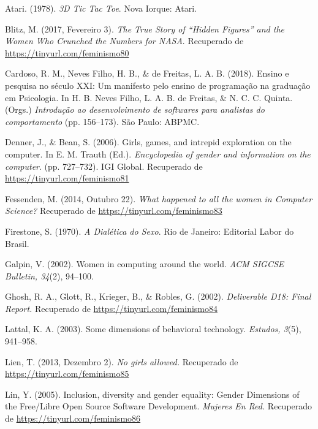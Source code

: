 \hangindent=25pt
\noindent Atari. (1978). \textit{3D Tic Tac Toe}. Nova Iorque: Atari.

\hangindent=25pt
\noindent Blitz, M. (2017, Fevereiro 3). \textit{The True Story of “Hidden Figures” and the Women Who Crunched the Numbers for NASA}. Recuperado de \url{https://tinyurl.com/feminismo80}

\hangindent=25pt
\noindent Cardoso, R. M., Neves Filho, H. B., \& de Freitas, L. A. B. (2018). Ensino e pesquisa no século XXI: Um manifesto pelo ensino de programação na graduação em Psicologia. In H. B. Neves Filho, L. A. B. de Freitas, \& N. C. C. Quinta. (Orgs.) \textit{Introdução ao desenvolvimento de softwares para analistas do comportamento} (pp. 156–173). São Paulo: ABPMC.

\hangindent=25pt
\noindent Denner, J., \& Bean, S. (2006). Girls, games, and intrepid exploration on the computer. In E. M. Trauth (Ed.). \textit{Encyclopedia of gender and information on the computer}. (pp. 727–732). IGI Global. Recuperado de \url{https://tinyurl.com/feminismo81}

\hangindent=25pt
\noindent Fessenden, M. (2014, Outubro 22). \textit{What happened to all the women in Computer Science?} Recuperado de \url{https://tinyurl.com/feminismo83}

\hangindent=25pt
\noindent Firestone, S. (1970). \textit{A Dialética do Sexo}. Rio de Janeiro: Editorial Labor do Brasil.

\hangindent=25pt
\noindent Galpin, V. (2002). Women in computing around the world. \textit{ACM SIGCSE Bulletin, 34}(2), 94–100.

\hangindent=25pt
\noindent Ghosh, R. A., Glott, R., Krieger, B., \& Robles, G. (2002). \textit{Deliverable D18: Final Report.} Recuperado de \url{https://tinyurl.com/feminismo84}

\hangindent=25pt
\noindent Lattal, K. A. (2003). Some dimensions of behavioral technology. \textit{Estudos, 3}(5), 941–958.

\hangindent=25pt
\noindent Lien, T. (2013, Dezembro 2). \textit{No girls allowed.} Recuperado de \url{https://tinyurl.com/feminismo85}

\hangindent=25pt
\noindent Lin, Y. (2005). Inclusion, diversity and gender equality: Gender Dimensions of the Free/Libre Open Source Software Development. \textit{Mujeres En Red.} Recuperado de \url{https://tinyurl.com/feminismo86}

